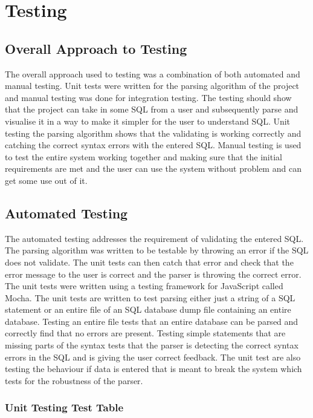 \chapter{Testing}

\section{Overall Approach to Testing}

The overall approach used to testing was a combination of both automated and manual testing. Unit tests were written for the parsing algorithm of the project and manual testing was done for integration testing. The testing should show that the project can take in some SQL from a user and subsequently parse and visualise it in a way to make it simpler for the user to understand SQL. Unit testing the parsing algorithm shows that the validating is working correctly and catching the correct syntax errors with the entered SQL. Manual testing is used to test the entire system working together and making sure that the initial requirements are met and the user can use the system without problem and can get some use out of it.

\section{Automated Testing}

The automated testing addresses the requirement of validating the entered SQL. The parsing algorithm was written to be testable by throwing an error if the SQL does not validate. The unit tests can then catch that error and check that the error message to the user is correct and the parser is throwing the correct error. The unit tests were written using a testing framework for JavaScript called Mocha\cite{mocha}. The unit tests are written to test parsing either just a string of a SQL statement or an entire file of an SQL database dump file containing an entire database. Testing an entire file tests that an entire database can be parsed and correctly find that no errors are present. Testing simple statements that are missing parts of the syntax tests that the parser is detecting the correct syntax errors in the SQL and is giving the user correct feedback. The unit test are also testing the behaviour if data is entered that is meant to break the system which tests for the robustness of the parser.

\subsection{Unit Testing Test Table}

